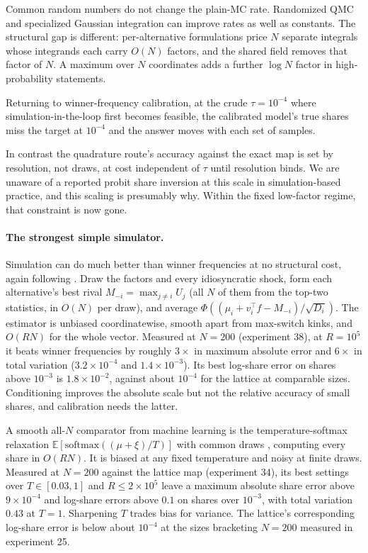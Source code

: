 \documentclass[12pt]{article}
\theoremstyle{remark}
\newcommand{\E}{\mathbb{E}}
\begin{document}
Common random numbers do not change the plain-MC rate. Randomized QMC and
specialized Gaussian integration can improve rates as well as
constants. The structural gap is different: per-alternative
formulations price $N$ separate integrals whose integrands each carry
$O(N)$ factors, and the shared field removes that factor of $N$. A
maximum over $N$ coordinates adds a further $\log N$ factor in
high-probability statements.

Returning to winner-frequency calibration, at the crude
$\tau = 10^{-4}$ where simulation-in-the-loop first becomes feasible, the calibrated model's true
shares miss the target at $10^{-4}$ and the answer moves with each set of samples. 

In contrast the quadrature route's accuracy against the exact map is set by
resolution, not draws, at cost independent of $\tau$ until resolution
binds. We are unaware of a reported
probit share inversion at this scale in simulation-based practice, and this
scaling is presumably why. Within the fixed low-factor regime, that constraint is now gone. 



\paragraph{The strongest simple simulator.} Simulation can do much
better than winner frequencies at no structural cost, again following
\citet{train1995}. Draw the factors
and every idiosyncratic shock, form each alternative's best rival
$M_{-i} = \max_{j \ne i} U_j$ (all $N$ of them from the top-two
statistics, in $O(N)$ per draw), and average $\Phi((\mu_i + v_i^\top
f - M_{-i})/\sqrt{D_i})$. The estimator is unbiased coordinatewise,
smooth apart from max-switch kinks, and $O(RN)$ for the whole vector.
Measured at $N = 200$ (experiment 38), at $R = 10^5$ it beats winner
frequencies by roughly $3\times$ in maximum absolute error and
$6\times$ in total variation ($3.2\times10^{-4}$ and
$1.4\times10^{-3}$). Its best log-share error on shares above $10^{-3}$
is $1.8\times10^{-2}$, against about $10^{-4}$ for the lattice at
comparable sizes. Conditioning improves the absolute scale but not the relative accuracy
of small shares, and calibration needs the latter.

A smooth all-$N$ comparator from machine learning is the
temperature-softmax relaxation $\E[\mathrm{softmax}((\mu + \xi)/T)]$
with common draws \citep{collier2021,berthet2020}, computing every
share in $O(RN)$. It is biased at any fixed temperature and noisy at
finite draws. Measured at $N = 200$ against the lattice map (experiment
34), its best settings over $T \in [0.03, 1]$ and $R \le 2\times10^5$
leave a maximum absolute share error above $9\times10^{-4}$ and
log-share errors above $0.1$ on shares over $10^{-3}$, with total
variation $0.43$ at $T = 1$. Sharpening $T$ trades bias for variance.
The lattice's corresponding log-share error is below about $10^{-4}$
at the sizes bracketing $N = 200$ measured in experiment 25.
\end{document}
